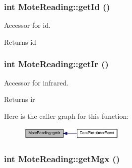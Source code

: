\hypertarget{classMoteReading_a123a08348d6a1ba80a4055cb5f5afaa6}{
\subsubsection[{getId}]{\setlength{\rightskip}{0pt plus 5cm}int MoteReading::getId ()}}
\label{classMoteReading_a123a08348d6a1ba80a4055cb5f5afaa6}


Accessor for id. 

\begin{DoxyReturn}{Returns}
id 
\end{DoxyReturn}
\hypertarget{classMoteReading_aff0d87f9c667d01f7e37a114afa321fa}{
\subsubsection[{getIr}]{\setlength{\rightskip}{0pt plus 5cm}int MoteReading::getIr ()}}
\label{classMoteReading_aff0d87f9c667d01f7e37a114afa321fa}


Accessor for infrared. 

\begin{DoxyReturn}{Returns}
ir 
\end{DoxyReturn}


Here is the caller graph for this function:\nopagebreak
\begin{figure}[H]
\begin{center}
\leavevmode
\includegraphics[width=143pt]{classMoteReading_aff0d87f9c667d01f7e37a114afa321fa_icgraph}
\end{center}
\end{figure}


\hypertarget{classMoteReading_a318b7e6afba062ee3df207495070e277}{
\subsubsection[{getMgx}]{\setlength{\rightskip}{0pt plus 5cm}int MoteReading::getMgx ()}}
\label{classMoteReading_a318b7e6afba062ee3df207495070e277}



